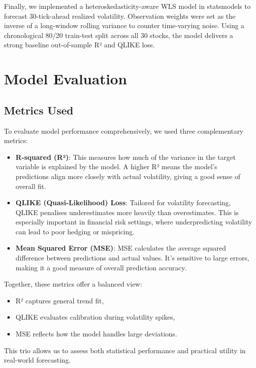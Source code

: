\documentclass[
  letterpaper,
  DIV=11,
  numbers=noendperiod]{scrartcl}
\providecommand{\tightlist}{%
  \setlength{\itemsep}{0pt}\setlength{\parskip}{0pt}}\usepackage{longtable,booktabs,array}
\begin{document}
Finally, we implemented a heteroskedasticity-aware WLS model in
statsmodels to forecast 30-tick-ahead realized volatility. Observation
weights were set as the inverse of a long-window rolling variance to
counter time-varying noise. Using a chronological 80/20 train-test split
across all 30 stocks, the model delivers a strong baseline out-of-sample
R² and QLIKE loss.

\section{Model Evaluation}\label{model-evaluation}

\subsection{Metrics Used}\label{metrics-used}

To evaluate model performance comprehensively, we used three
complementary metrics:

\begin{itemize}
\item
  \textbf{R-squared (R²)}: This measures how much of the variance in the
  target variable is explained by the model. A higher R² means the
  model's predictions align more closely with actual volatility, giving
  a good sense of overall fit.
\item
  \textbf{QLIKE (Quasi-Likelihood) Loss}: Tailored for volatility
  forecasting, QLIKE penalises underestimates more heavily than
  overestimates. This is especially important in financial risk
  settings, where underpredicting volatility can lead to poor hedging or
  mispricing.
\item
  \textbf{Mean Squared Error (MSE)}: MSE calculates the average squared
  difference between predictions and actual values. It's sensitive to
  large errors, making it a good measure of overall prediction accuracy.
\end{itemize}

Together, these metrics offer a balanced view:

\begin{itemize}
\tightlist
\item
  R² captures general trend fit,
\item
  QLIKE evaluates calibration during volatility spikes,
\item
  MSE reflects how the model handles large deviations.
\end{itemize}

This trio allows us to assess both statistical performance and practical
utility in real-world forecasting.
\end{document}
